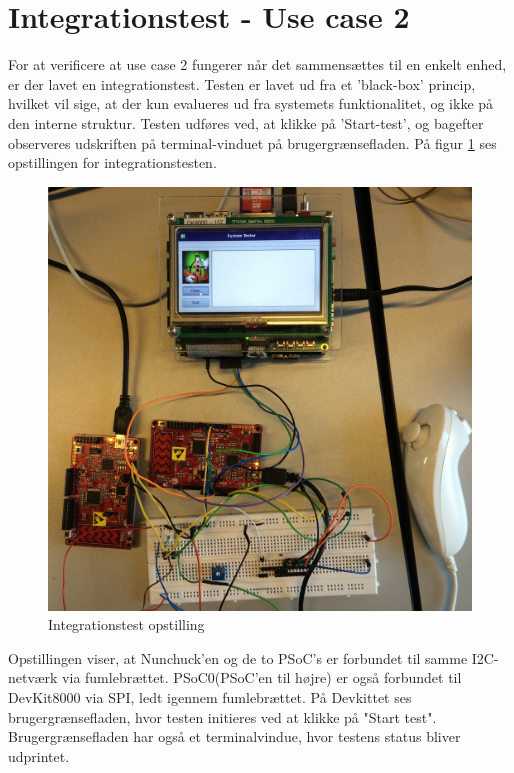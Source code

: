 \section{Integrationstest - Use case 2}
For at verificere at use case 2 fungerer når det sammensættes til en enkelt enhed, er der lavet en integrationstest. Testen er lavet ud fra et 'black-box' princip, hvilket vil sige, at der kun evalueres ud fra systemets funktionalitet, og ikke på den interne struktur.
Testen udføres ved, at klikke på 'Start-test', og bagefter observeres udskriften på terminal-vinduet på brugergrænsefladen. På figur \ref{figure:IntegrationstestOpstilling} ses opstillingen for integrationstesten.

\begin{figure}[H]
	\includegraphics[width=\textwidth]{Test/images/IntegrationstestProtokoller/opstilling}
	\caption{Integrationstest opstilling}
	\label{figure:IntegrationstestOpstilling}
\end{figure}

Opstillingen viser, at Nunchuck'en og de to PSoC's er forbundet til samme I2C-netværk via fumlebrættet. PSoC0(PSoC'en til højre) er også forbundet til DevKit8000 via SPI, ledt igennem fumlebrættet. På Devkittet ses brugergrænsefladen, hvor testen initieres ved at klikke på "Start test". Brugergrænsefladen har også et terminalvindue, hvor testens status bliver udprintet.

